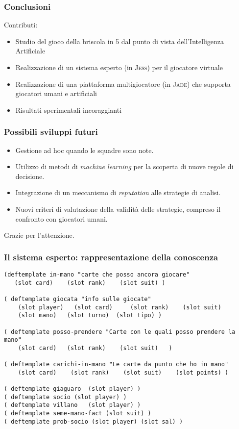 \documentclass{beamer}
\newcommand*\lista{\item[$\diamondsuit$]}
\begin{document}

\begin{frame}
   \frametitle{Conclusioni}
   Contributi:
   
   \begin{itemize}
      \lista Studio del gioco della briscola in 5 dal punto di vista dell'Intelligenza Artificiale
      \lista Realizzazione di un sistema esperto (in \textsc{Jess}) per il giocatore virtuale
      \lista Realizzazione di una piattaforma multigiocatore (in \textsc{Jade}) che supporta giocatori umani e artificiali
      \lista Risultati sperimentali incoraggianti   
   \end{itemize}
   
\end{frame}
   

\begin{frame}
   \frametitle{Possibili sviluppi futuri}
   \begin{itemize}
      \lista Gestione ad hoc quando le squadre sono note.
      \lista Utilizzo di metodi di \emph{machine learning} per la scoperta di nuove regole di decisione.
      \lista Integrazione di un meccanismo di \emph{reputation} alle strategie di analisi.
      \lista Nuovi criteri di valutazione della validità delle strategie, compreso il confronto con giocatori umani.
   \end{itemize}
   
\end{frame}


\begin{frame}
   \centering
   Grazie per l'attenzione.
\end{frame}

\begin{frame}[fragile]
   \frametitle{Il sistema esperto: rappresentazione della conoscenza}
\begin{lstlisting}
(deftemplate in-mano "carte che posso ancora giocare"
   (slot card)    (slot rank)    (slot suit) )

( deftemplate giocata "info sulle giocate"
    (slot player)	(slot card)		(slot rank)    (slot suit)
    (slot mano)   (slot turno)	(slot tipo) )

( deftemplate posso-prendere "Carte con le quali posso prendere la mano"
    (slot card)   (slot rank)    (slot suit)   )

( deftemplate carichi-in-mano "Le carte da punto che ho in mano"
    (slot card)    (slot rank)    (slot suit)    (slot points) )

( deftemplate giaguaro  (slot player) )
( deftemplate socio (slot player) )
( deftemplate villano   (slot player) )
( deftemplate seme-mano-fact (slot suit) )
( deftemplate prob-socio (slot player) (slot sal) )
\end{lstlisting} 
\end{frame}
\end{document}
